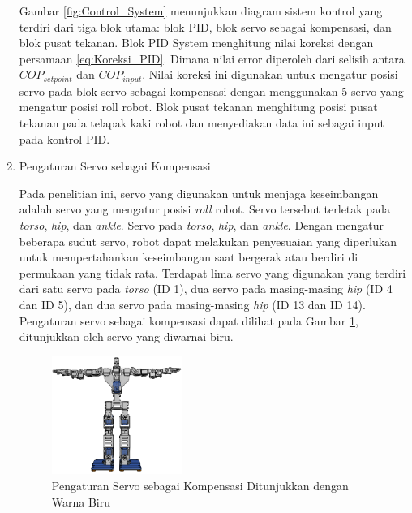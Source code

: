 \begin{enumerate}[label=\Alph*.]
    \hspace*{1em}  Gambar \ref{fig:Control_System} menunjukkan diagram sistem kontrol yang terdiri dari tiga blok utama: blok PID, blok servo sebagai kompensasi, dan blok pusat tekanan. Blok {PID System} menghitung nilai koreksi dengan persamaan \ref{eq:Koreksi_PID}. Dimana nilai error diperoleh dari selisih antara $COP_{setpoint}$ dan $COP_{input}$. Nilai koreksi ini digunakan untuk mengatur posisi servo pada blok servo sebagai kompensasi dengan menggunakan 5 servo yang mengatur posisi roll robot. Blok pusat tekanan menghitung posisi pusat tekanan pada telapak kaki robot dan menyediakan data ini sebagai input pada kontrol PID.

    \item Pengaturan Servo sebagai Kompensasi
    \label{subsec:servosettings}

    \hspace*{1em} Pada penelitian ini, servo yang digunakan untuk menjaga keseimbangan adalah servo yang mengatur posisi \textit{roll} robot. Servo tersebut terletak pada \textit{torso}, \textit{hip}, dan \textit{ankle}. Servo pada \textit{torso}, \textit{hip}, dan \textit{ankle}. Dengan mengatur beberapa sudut servo, robot dapat melakukan penyesuaian yang diperlukan untuk mempertahankan keseimbangan saat bergerak atau berdiri di permukaan yang tidak rata. Terdapat lima servo yang digunakan yang terdiri dari satu servo pada \textit{torso} (ID 1), dua servo pada masing-masing \textit{hip} (ID 4 dan ID 5), dan dua servo pada masing-masing \textit{hip} (ID 13 dan ID 14). Pengaturan servo sebagai kompensasi dapat dilihat pada Gambar \ref{fig:Controlled_Servo}, ditunjukkan oleh servo yang diwarnai biru.

    \begin{figure} [h] \centering
      \includegraphics[width=0.4\textwidth]{gambar/controlled_servo.png}
      \caption{Pengaturan Servo sebagai Kompensasi Ditunjukkan dengan Warna Biru}
      \label{fig:Controlled_Servo}
    \end{figure}
    

\end{enumerate}
